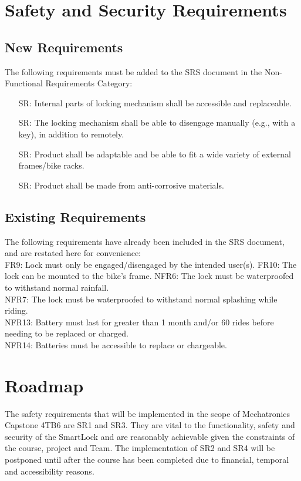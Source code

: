 \documentclass{article}
\newcounter{srnum} %
\begin{document}
\section{Safety and Security Requirements}
\subsection{New Requirements}
The following requirements must be added to the SRS document in the Non-Functional Requirements Category:
\begin{itemize}
\item[SR\refstepcounter{srnum}\thesrnum\label{SR1}:] Internal parts of locking mechanism shall be accessible and replaceable.
\item[SR\refstepcounter{srnum}\thesrnum\label{SR2}:] The locking mechanism shall be able to disengage manually (e.g., with a key), in addition to remotely.
\item[SR\refstepcounter{srnum}\thesrnum\label{SR3}:] Product shall be adaptable and be able to fit a wide variety of external frames/bike racks.
\item[SR\refstepcounter{srnum}\thesrnum\label{SR4}:] Product shall be made from anti-corrosive materials. 
\end{itemize}

\subsection{Existing Requirements}

The following requirements have already been included in the SRS document, and are restated here for convenience: \\

 \noindent FR9: Lock must only be engaged/disengaged by the intended user(s). \newline 
 FR10: The lock can be mounted to the bike's frame. \newline
 NFR6: The lock must be waterproofed to withstand normal rainfall. \\
 NFR7: The lock must be waterproofed to withstand normal splashing while riding. \\
 NFR13: Battery must last for greater than 1 month and/or 60 rides before needing to be replaced or charged. \\
 NFR14: Batteries must be accessible to replace or chargeable. \\


\section{Roadmap}
The safety requirements that will be implemented in the scope of Mechatronics Capstone 4TB6 are SR1 and SR3. They are vital to the functionality, safety and security of the SmartLock and are reasonably achievable given the constraints of the course, project and Team. The implementation of SR2 and SR4 will be postponed until after the course has been completed due to financial, temporal and accessibility reasons. 
\end{document}

